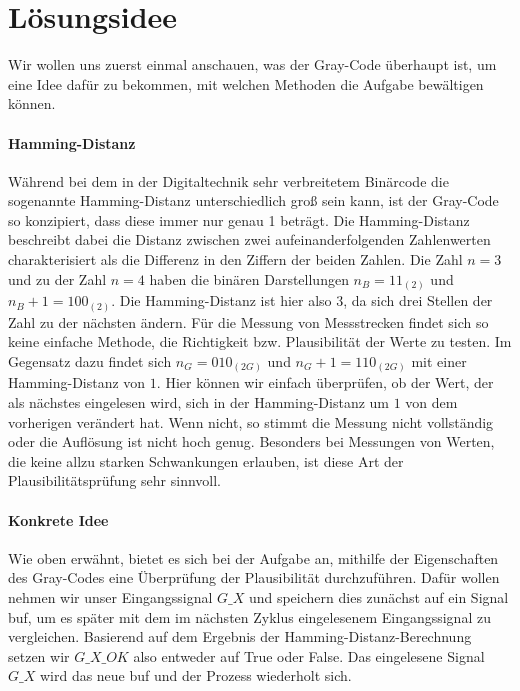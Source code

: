 \documentclass{report}
\begin{document}
\section{Lösungsidee}
\label{sec:losungsidee}
Wir wollen uns zuerst einmal anschauen, was der Gray-Code überhaupt ist, um eine Idee dafür zu bekommen, mit welchen Methoden die Aufgabe bewältigen können.


\paragraph{Hamming-Distanz}
Während bei dem in der Digitaltechnik sehr verbreitetem Binärcode die sogenannte Hamming-Distanz unterschiedlich groß sein kann, ist der Gray-Code so konzipiert, dass diese immer nur genau 1 beträgt. Die Hamming-Distanz beschreibt dabei die Distanz zwischen zwei aufeinanderfolgenden Zahlenwerten charakterisiert als die Differenz in den Ziffern der beiden Zahlen. Die Zahl $n = 3$ und zu der Zahl $n = 4$ haben die binären Darstellungen $n_{B} = 11_{(2)}$ und $n_{B}+1 = 100_{(2)}$. Die Hamming-Distanz ist hier also $3$, da sich drei Stellen der Zahl zu der nächsten ändern. Für die Messung von Messstrecken findet sich so keine einfache Methode, die Richtigkeit bzw. Plausibilität der Werte zu testen. Im Gegensatz dazu findet sich $n_{G} = 010_{(2G)}$ und $n_{G}+1 = 110_{(2G)}$ mit einer Hamming-Distanz von $1$. Hier können wir einfach überprüfen, ob der Wert, der als nächstes eingelesen wird, sich in der Hamming-Distanz um $1$ von dem vorherigen verändert hat. Wenn nicht, so stimmt die Messung nicht vollständig oder die Auflösung ist nicht hoch genug. Besonders bei Messungen von Werten, die keine allzu starken Schwankungen erlauben, ist diese Art der Plausibilitätsprüfung sehr sinnvoll.

\paragraph{Konkrete Idee}
Wie oben erwähnt, bietet es sich bei der Aufgabe an, mithilfe der Eigenschaften des Gray-Codes eine Überprüfung der Plausibilität durchzuführen. Dafür wollen nehmen wir unser Eingangssignal $G\_{X}$ und speichern dies zunächst auf ein Signal buf, um es später mit dem im nächsten Zyklus eingelesenem Eingangssignal zu vergleichen. Basierend auf dem Ergebnis der Hamming-Distanz-Berechnung setzen wir $G\_X\_OK$ also entweder auf True oder False. Das eingelesene Signal $G\_{X}$ wird das neue buf und der Prozess wiederholt sich.

\newpage
\end{document}
